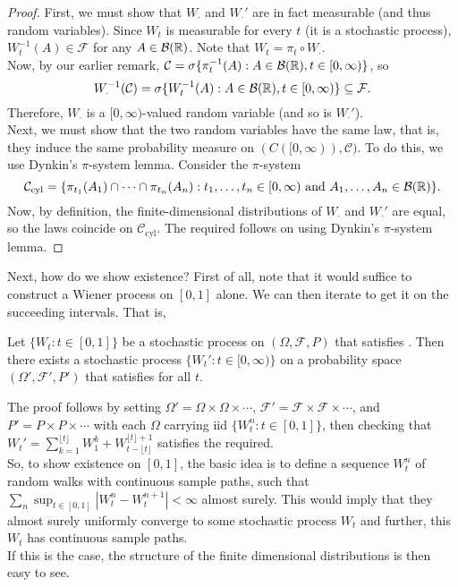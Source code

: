	\begin{proof}
		First, we must show that $W_{\cdot}$ and $W_{\cdot}'$ are in fact measurable (and thus random variables). Since $W_t$ is measurable for every $t$ (it is a stochastic process), $W_t^{-1}(A)\in\mathcal{F}$ for any $A\in\mathcal{B}(\mathbb{R})$. Note that $W_t = \pi_t\circ W_\cdot$.\\
		Now, by our earlier remark, $\mathcal{C} = \sigma\{\pi_t^{-1}(A) : A\in\mathcal{B}(\mathbb{R}), t\in[0,\infty)\}$, so
		\[ W_{\cdot}^{-1}(\mathcal{C}) = \sigma\{W_t^{-1}(A) : A\in\mathcal{B}(\mathbb{R}), t\in[0,\infty)\}\subseteq \mathcal{F}. \]
		Therefore, $W_{\cdot}$ is a $[0,\infty)$-valued random variable (and so is $W_{\cdot}'$).\\

		Next, we must show that the two random variables have the same law, that is, they induce the same probability measure on $(C([0,\infty)),\mathcal{C})$. To do this, we use Dynkin's $\pi$-system lemma. Consider the $\pi$-system
		\[ \mathcal{C}_{\text{cyl}} = \{ \pi_{t_1}(A_1)\cap\cdots\cap\pi_{t_n}(A_n) : t_1,\ldots,t_n\in[0,\infty) \text{ and } A_1,\ldots,A_n\in\mathcal{B}(\mathbb{R}) \}. \]
		Now, by definition, the finite-dimensional distributions of $W_{\cdot}$ and $W_{\cdot}'$ are equal, so the laws coincide on $\mathcal{C}_\text{cyl}$. The required follows on using Dynkin's $\pi$-system lemma.
	\end{proof}

	Next, how do we show existence? First of all, note that it would suffice to construct a Wiener process on $[0,1]$ alone. We can then iterate to get it on the succeeding intervals. That is,
	\begin{lemma}
		Let $\{W_t : t\in[0,1]\}$ be a stochastic process on $(\Omega,\mathcal{F},P)$ that satisfies . Then there exists a stochastic process $\{W_t' : t\in[0,\infty)\}$ on a probability space $(\Omega',\mathcal{F}',P')$ that satisfies  for all $t$.
	\end{lemma}

	The proof follows by setting $\Omega'=\Omega\times\Omega\times\cdots$, $\mathcal{F}'=\mathcal{F}\times\mathcal{F}\times\cdots$, and $P'=P\times P\times\cdots$ with each $\Omega$ carrying iid $\{W_t^n : t\in[0,1] \}$, then checking that $W_t' = \sum_{k=1}^{\lfloor t\rfloor} W_1^k + W_{t-\lfloor t\rfloor}^{\lfloor t\rfloor+1}$ satisfies the required.\\

	So, to show existence on $[0,1]$, the basic idea is to define a sequence $W_t^n$ of random walks with continuous sample paths, such that $\sum_n \sup_{t\in[0,1]} |W_t^n - W_t^{n+1}| < \infty$ almost surely. This would imply that they almost surely uniformly converge to some stochastic process $W_t$ and further, this $W_t$ has continuous sample paths.\\
	If this is the case, the structure of the finite dimensional distributions is then easy to see.\\

